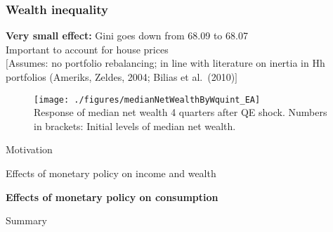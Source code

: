 \documentclass[pdflatex,aspectratio=169]{beamer}
\newcommand{\jemph}[1]{{\color{StataDarkBlue}#1}}
\newcommand{\jbemph}[1]{\textbf{\color{SlideNavy}#1}}
\begin{document}
\begin{frame}\frametitle{\bf Wealth inequality \hypertarget{WealthIneq}{}}
\jbemph{Very small effect:} Gini goes down from 68.09 to 68.07\\
\hspace*{32mm}Important to account for house prices \hyperlink{WealthDecomp}{}\\
{\scriptsize $[$Assumes: \jemph{no portfolio rebalancing;} in line with literature on inertia in Hh portfolios (Ameriks, Zeldes, 2004; Bilias et al.\ (2010)$]$}
\begin{figure}
\begin{center}
\texttt{[image: ./figures/medianNetWealthByWquint\_EA]}\\[-2mm]
{\tiny Response of median net wealth 4 quarters after QE shock. Numbers in brackets: Initial levels of median net wealth.
}
\end{center}
\end{figure}
\end{frame}



\begin{frame}
\bi\setlength{\itemsep}{3mm}
\item Motivation
\item Effects of monetary policy on income and wealth
\item \jbemph{Effects of monetary policy on consumption}
\item Summary
\ei
\end{frame}
\end{document}
